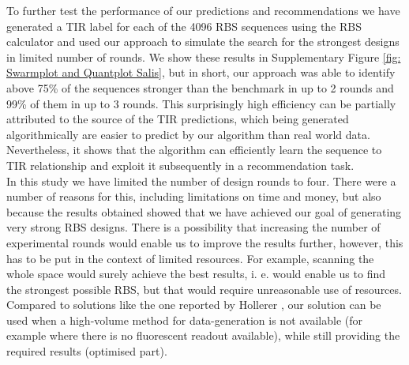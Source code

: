 \documentclass{scrartcl}[2013/05/29]%
\begin{document}
To further test the performance of our predictions and recommendations we have generated a TIR label for each of the 4096 RBS sequences using the RBS calculator \cite{Salis2009} and used our approach to simulate the search for the strongest designs in limited number of rounds.
We show these results in Supplementary Figure \ref{fig: Swarmplot and Quantplot Salis}, but in short, our approach was able to  identify above 75\% of the sequences stronger than the benchmark in up to 2 rounds and 99\% of them in up to 3 rounds.
This surprisingly high efficiency can be partially attributed to the source of the TIR predictions, which being generated algorithmically are easier to predict by our algorithm than real world data.
Nevertheless, it shows that the algorithm can efficiently learn the sequence to TIR relationship and exploit it subsequently in a recommendation task.\\

In this study we have limited the number of design rounds to four.
There were a number of reasons for this, including limitations on time and money, but also because the results obtained showed that we have achieved our goal of generating very strong RBS designs.
There is a possibility that increasing the number of experimental rounds would enable us to improve the results further, however, this has to be put in the context of limited resources.
For example, scanning the whole space would surely achieve the best results, i. e. would enable us to find the strongest possible RBS, but that would require unreasonable use of resources.
Compared to solutions like the one reported by Hollerer \cite{Hollerer2020}, our solution can be used when a high-volume method for data-generation is not available (for example where there is no fluorescent readout available), while still providing the required results (optimised part). \\
\end{document}

